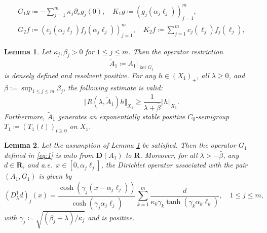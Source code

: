 \documentclass[10pt,a4paper]{amsart}
\newtheorem{lemma}{Lemma}
\def\R{\mathbf{R}}
\def\ka{\kappa}
\def\la{\lambda}
\begin{document}
\begin{equation}\label{eq:1}
\begin{gathered}
G_1g\coloneqq -\sum_{j=1}^{m}\ka_j\partial_{x}g_j(0),\quad K_1g\coloneqq (g_j(\alpha_j\ell_j))_{j=1}^m,\\
 G_2f\coloneqq (c_j(\alpha_j\ell_j)f_j(\alpha_j\ell_j))_{j=1}^m,\quad K_2f\coloneqq \sum_{j=1}^{m}c_j(\ell_j)f_j(\ell_j),
\end{gathered}
\end{equation}

\begin{lemma}\label{heat-star-exp-stab}
Let $\ka_j,\beta_j>0$ for $1 \le j\le m$. Then the operator restriction
\begin{equation*}
\tilde{A}_1\coloneqq A_1\vert_{\ker G_1}
\end{equation*}
is densely defined and resolvent positive. For any $h\in (X_1)_+$, all $\lambda\ge 0$, and $\bar{\beta}:=\sup_{1\le j\le m}\beta_j$, the following estimate is valid:
\begin{equation}\label{invers-estimate}
\Vert R(\lambda,\tilde{A}_1)h\Vert_{X_1}\ge \frac{1}{\lambda+\bar{\beta}}\Vert h\Vert_{X_1}.
\end{equation}
Furthermore, $\tilde{A}_1$ generates an exponentially stable positive $C_0$-semigroup $T_1\coloneqq (T_1(t))_{t\ge 0}$ on $X_1$.
\end{lemma}

\begin{lemma}\label{Dirichlet-heat-lemma}
Let the assumption of Lemma \ref{heat-star-exp-stab} be satisfied. Then the operator $G_1$ defined in \eqref{eq:1} is onto from ${\bm D}(A_1)$ to $\R$. Moreover, for all $\lambda>-\bar{\beta}$, any $d\in \R$, and a.e.\ $x\in [0,\alpha_j\ell_{j}]$, the Dirichlet operator associated with the pair $(A_1,G_1)$ is given by
\begin{equation}\label{Dirichlet-heat}
(D_\la^1 d)_j(x)= \frac{\cosh(\gamma_j (x-\alpha_j \ell_j))}{\cosh(\gamma_j \alpha_j \ell_j)}\sum_{k=1}^m \frac{d}{\kappa_k \gamma_k \tanh(\gamma_k \alpha_k \ell_k)},\quad 1 \le j\le m,
\end{equation}
with $\gamma_j\coloneqq\sqrt{{(\beta_j+\lambda)}/{\kappa_j}}$ and is positive.
\end{lemma}
\end{document}
